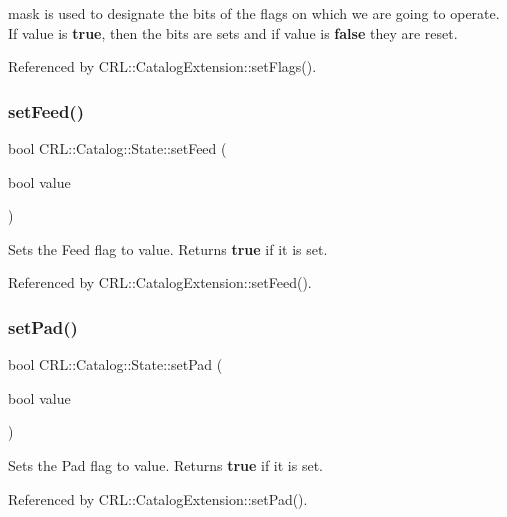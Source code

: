 {\ttfamily mask} is used to designate the bits of the flags on which we are going to operate. If {\ttfamily value} is {\bfseries true}, then the bits are sets and if {\ttfamily value} is {\bfseries false} they are reset. 

Referenced by C\+R\+L\+::\+Catalog\+Extension\+::set\+Flags().

\mbox{\label{classCRL_1_1Catalog_1_1State_ab5936e80369947177be88c3d770f4725}} 
\subsubsection{\texorpdfstring{set\+Feed()}{setFeed()}}
{\footnotesize\ttfamily bool C\+R\+L\+::\+Catalog\+::\+State\+::set\+Feed (\begin{DoxyParamCaption}\item[{bool}]{value }\end{DoxyParamCaption})\hspace{0.3cm}{\ttfamily [inline]}}

Sets the Feed flag to {\ttfamily value}. Returns {\bfseries true} if it is set. 

Referenced by C\+R\+L\+::\+Catalog\+Extension\+::set\+Feed().

\mbox{\label{classCRL_1_1Catalog_1_1State_a97e2158809ed0e88237bb92eb8daa290}} 
\subsubsection{\texorpdfstring{set\+Pad()}{setPad()}}
{\footnotesize\ttfamily bool C\+R\+L\+::\+Catalog\+::\+State\+::set\+Pad (\begin{DoxyParamCaption}\item[{bool}]{value }\end{DoxyParamCaption})\hspace{0.3cm}{\ttfamily [inline]}}

Sets the Pad flag to {\ttfamily value}. Returns {\bfseries true} if it is set. 

Referenced by C\+R\+L\+::\+Catalog\+Extension\+::set\+Pad().

